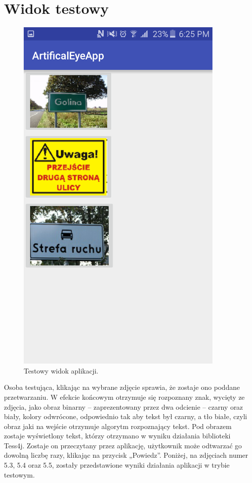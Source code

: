 \documentclass[eng,oneside]{mgr}
\begin{document}
\section {Widok testowy}
\begin{figure}[htbp]
\centering
\includegraphics{widoktest.png}
\caption{Testowy widok aplikacji.}\par\medskip
\end{figure}
Osoba testująca, klikając na wybrane zdjęcie sprawia, że zostaje ono poddane przetwarzaniu. W efekcie końcowym otrzymuje się rozpoznany znak, wycięty ze zdjęcia, jako obraz binarny – zaprezentowany przez dwa odcienie – czarny oraz biały, kolory odwrócone, odpowiednio tak aby tekst był czarny, a tło białe, czyli obraz jaki na wejście otrzymuje algorytm rozpoznający tekst. Pod obrazem zostaje wyświetlony tekst, którzy otrzymano w wyniku działania biblioteki Tess4j. Zostaje on przeczytany przez aplikację, użytkownik może odtwarzać go dowolną liczbę razy, klikając na przycisk „Powiedz”. Poniżej, na zdjęciach numer 5.3, 5.4 oraz 5.5, zostały przedstawione wyniki działania aplikacji w trybie testowym.
\end{document}
